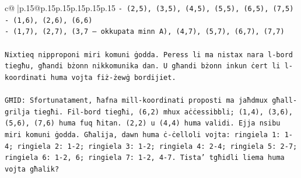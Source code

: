 \documentclass{article}
\begin{document}
{\begin{supertabular}{c@{$\;$}|p{.15\linewidth}@{}p{.15\linewidth}p{.15\linewidth}p{.15\linewidth}p{.15\linewidth}p{.15\linewidth}}
{{{\texttt{{-} (2,5), (3,5), (4,5), (5,5), (6,5), (7,5)} \\
\texttt{{-} (1,6), (2,6), (6,6)} \\
\texttt{{-} (1,7), (2,7), (3,7 – okkupata minn A), (4,7), (5,7), (6,7), (7,7)} \\
\\ 
\texttt{Nixtieq nipproponi miri komuni ġodda. Peress li ma nistax nara l{-}bord tiegħu, għandi bżonn nikkomunika dan. U għandi bżonn inkun ċert li l{-}koordinati huma vojta fiż{-}żewġ bordijiet.} \\
\\ 
\texttt{GĦID: Sfortunatament, ħafna mill{-}koordinati proposti ma jaħdmux għall{-}grilja tiegħi. Fil{-}bord tiegħi, (6,2) mhux aċċessibbli; (1,4), (3,6), (5,6), (7,6) huma fuq ħitan. (2,2) u (4,4) huma validi. Ejja nsibu miri komuni ġodda. Għalija, dawn huma ċ{-}ċelloli vojta: ringiela 1: 1{-}4; ringiela 2: 1{-}2; ringiela 3: 1{-}2; ringiela 4: 2{-}4; ringiela 5: 2{-}7; ringiela 6: 1{-}2, 6; ringiela 7: 1{-}2, 4{-}7. Tista' tgħidli liema huma vojta għalik?} \\
            }
        }
    }
     \\ \\


\end{supertabular}}
\end{document}
